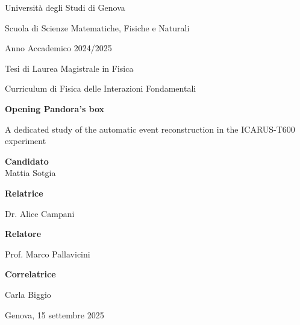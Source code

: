 \begin{titlepage}
    \ifdraft\BgThispage\fi
    \begin{center}

        {{Università degli Studi di Genova}}\par

        {Scuola di Scienze Matematiche, Fisiche e Naturali} \par

        \vspace{0.5cm}

        {Anno Accademico 2024/2025}

        \vfill

        Tesi di Laurea Magistrale in Fisica\par
        Curriculum di Fisica delle Interazioni Fondamentali

        \vfill

        \begin{minipage}{0.775\linewidth}
            \centering
            \huge
            \bfseries
            {\LARGE Opening Pandora's box}\par%
            {\Large A dedicated study of the automatic event reconstruction in the ICARUS-T600 experiment}%
        \end{minipage}

        \vfill

        \textbf{\small Candidato}\\{Mattia Sotgia}%
%
        \vfill%

        \begin{minipage}{0.45\linewidth}%
            \textbf{\small Relatrice}\par%
            {Dr. Alice Campani}\par\vspace{1em}%
            \textbf{\small Relatore}\par%
            {Prof. Marco Pallavicini}%
        \end{minipage}%
        \hfill%
        \begin{minipage}{0.45\linewidth}
            \raggedleft
            \textbf{\small Correlatrice}\par
            {Carla Biggio}
        \end{minipage}

        \vspace{2cm}

		Genova, 15 settembre 2025
    \end{center}
\end{titlepage}
